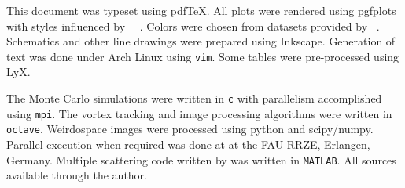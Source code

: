 This document was typeset using pdf\TeX. All plots were rendered using
pgfplots~\cite{feuersangerpgfplots} with styles influenced by
~\cite{tufte1983visual}~\cite{tufte1991envisioning}.
Colors were chosen from datasets provided by
~\cite{harrower2003colorbrewer}.  Schematics and other
line drawings were prepared using Inkscape. Generation of text was done
under Arch Linux using \texttt{vim}.  Some tables were pre-processed using
LyX.

The Monte Carlo simulations were written in \texttt{c} with parallelism
accomplished using \texttt{mpi}. The vortex tracking and image processing
algorithms were written in \texttt{octave}.  Weirdospace images were
processed using python and scipy/numpy.  Parallel execution when required
was done at at the FAU RRZE, Erlangen, Germany.  Multiple scattering code
written by  was written in \texttt{MATLAB}.  All sources
available through the author.